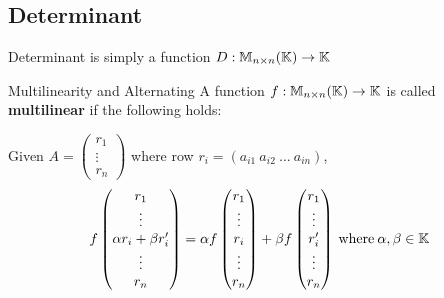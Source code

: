 \subsection{Determinant}

Determinant is simply a function \(D: \mathbb{M}_{n \times n}(\mathbb{K}) \to \mathbb{K}\)

\begin{definition} {Multilinearity and Alternating}
    A function \(f: \mathbb{M}_{n \times n}(\mathbb{K}) \to \mathbb{K}\) is called \textbf{multilinear} if the following holds:

    Given \(A = \begin{pmatrix}
    r_1 \\ \vdots \\ r_n
    \end{pmatrix}\) where row \(r_i = (a_{i1} \: a_{i2} \: \ldots \: a_{in})\), \[
    f \begin{pmatrix}
    r_1 \\ \vdots \\ \alpha r_i + \beta r'_i \\ \vdots \\ r_n
    \end{pmatrix} = \alpha f \begin{pmatrix}
    r_1 \\ \vdots \\ r_i \\ \vdots \\ r_n 
    \end{pmatrix} + \beta f \begin{pmatrix}
    r_1 \\ \vdots \\ r'_i \\ \vdots \\ r_n
    \end{pmatrix} \:\text{where}\: \alpha, \beta \in \mathbb{K}
    \]


\end{definition}
